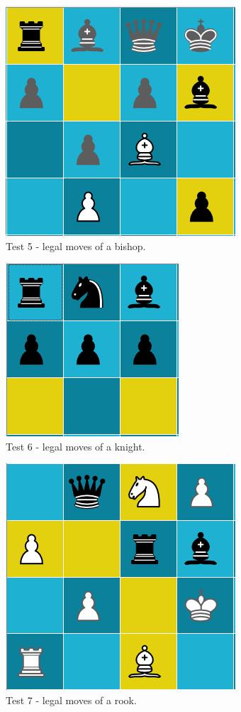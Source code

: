 \begin{figure}[H]
	\centering
	\includegraphics{images/screenshots/test-5}
	\caption{Test 5 - legal moves of a bishop.}
	\label{test-5}
\end{figure}
\begin{figure}[H]
	\centering
	\includegraphics{images/screenshots/test-6}
	\caption{Test 6 - legal moves of a knight.}
	\label{test-6}
\end{figure}
\begin{figure}[H]
	\centering
	\includegraphics{images/screenshots/test-7}
	\caption{Test 7 - legal moves of a rook.}
	\label{test-7}
\end{figure}
